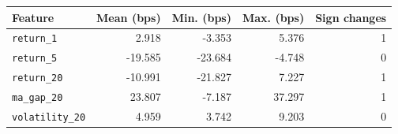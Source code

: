 \begin{tabular}{lrrrr}
\toprule
Feature & Mean (bps) & Min. (bps) & Max. (bps) & Sign changes \\
\midrule
\texttt{return\_1} & 2.918 & -3.353 & 5.376 & 1 \\
\texttt{return\_5} & -19.585 & -23.684 & -4.748 & 0 \\
\texttt{return\_20} & -10.991 & -21.827 & 7.227 & 1 \\
\texttt{ma\_gap\_20} & 23.807 & -7.187 & 37.297 & 1 \\
\texttt{volatility\_20} & 4.959 & 3.742 & 9.203 & 0 \\
\bottomrule
\end{tabular}
